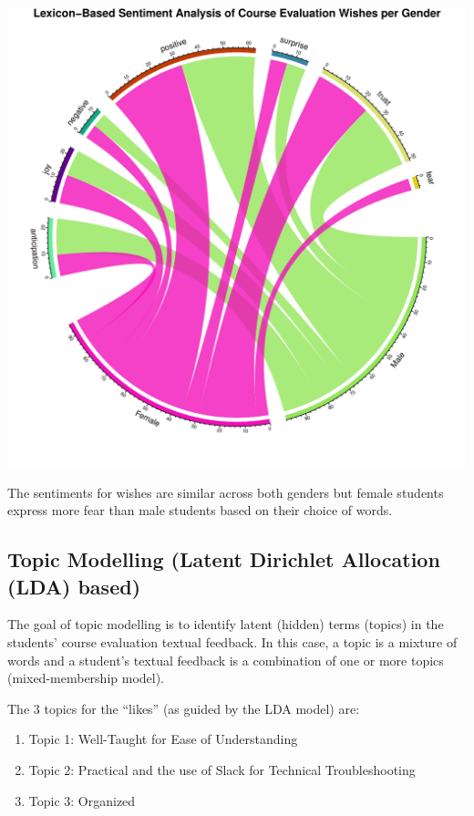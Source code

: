 \documentclass[
]{article}
\begin{document}
\includegraphics{Mid-SemesterCourseEvaluation-20240819-20241125-ADB-BBIT2.2_files/figure-latex/ChordDiagramPerGender_Wishes-1.pdf}

The sentiments for wishes are similar across both genders but female
students express more fear than male students based on their choice of
words.

\newpage

\subsection{Topic Modelling (Latent Dirichlet Allocation (LDA)
based)}\label{topic-modelling-latent-dirichlet-allocation-lda-based}

The goal of topic modelling is to identify latent (hidden) terms
(topics) in the students' course evaluation textual feedback. In this
case, a topic is a mixture of words and a student's textual feedback is
a combination of one or more topics (mixed-membership model).

The 3 topics for the ``likes'' (as guided by the LDA model) are:

\begin{enumerate}
\def\labelenumi{\arabic{enumi}.}
\item
  Topic 1: Well-Taught for Ease of Understanding
\item
  Topic 2: Practical and the use of Slack for Technical Troubleshooting
\item
  Topic 3: Organized
\end{enumerate}
\end{document}
